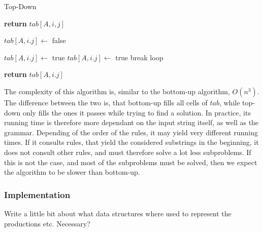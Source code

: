 \begin{algorithm}[H]
    \caption{Top-Down}
    \label{alg:td}
    \begin{algorithmic}[1]
                \State \textbf{return} $tab[A,i,j]$
            \EndIf

            \State $tab[A,i.j]\leftarrow$ false

                    \State $tab[A,i.j]\leftarrow$ true
                \EndIf
            \Else
                        \State $tab[A,i.j]\leftarrow$ true
                        \State break loop
                        \EndIf
                    \EndFor
                \EndFor
            \EndIf

            \State \textbf{return} $tab[A,i.j]$
        \EndProcedure
    \end{algorithmic}
\end{algorithm}

The complexity of this algorithm is, similar to the bottom-up algorithm, $O(n^3)$.
The difference between the two is, that bottom-up fills all cells of $tab$, while top-down only fills the ones it passes while trying to find a solution.
In practice, its running time is therefore more dependant on the input string itself, as well as the grammar.
Depending of the order of the rules, it may yield very different running times.
If it consults rules, that yield the considered substrings in the beginning, it does not consult other rules, and must therefore solve a lot less subproblems.
If this is not the case, and most of the subproblems must be solved, then we expect the algorithm to be slower than bottom-up.

\subsubsection{Implementation}
Write a little bit about what data structures where used to represent the productions etc. Necessary?






